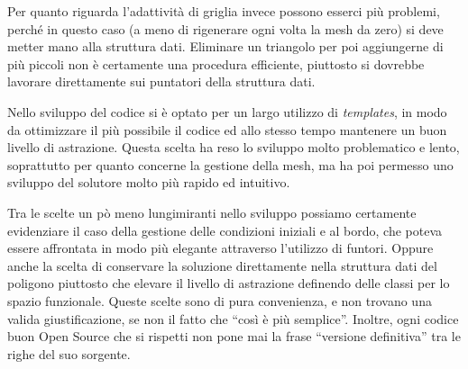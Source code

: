 Per quanto riguarda l'adattività di griglia invece possono esserci più problemi, perché in questo caso (a meno di rigenerare ogni volta la mesh da zero) si deve metter mano alla struttura dati. Eliminare un triangolo per poi aggiungerne di più piccoli non è certamente una procedura efficiente, piuttosto si dovrebbe lavorare direttamente sui puntatori della struttura dati.

Nello sviluppo del codice si è optato per un largo utilizzo di \emph{templates}, in modo da ottimizzare il più possibile il codice ed allo stesso tempo mantenere un buon livello di astrazione. Questa scelta ha reso lo sviluppo molto problematico e lento, soprattutto per quanto concerne la gestione della mesh, ma ha poi permesso uno sviluppo del solutore molto più rapido ed intuitivo.

Tra le scelte un pò meno lungimiranti nello sviluppo possiamo certamente evidenziare il caso della gestione delle condizioni iniziali e al bordo, che poteva essere affrontata in modo più elegante attraverso l'utilizzo di funtori. Oppure anche la scelta di conservare la soluzione direttamente nella struttura dati del poligono piuttosto che elevare il livello di astrazione definendo delle classi per lo spazio funzionale. Queste scelte sono di pura convenienza, e non trovano una valida giustificazione, se non il fatto che ``così è più semplice''. Inoltre, ogni codice buon Open Source che si rispetti non pone mai la frase ``versione definitiva'' tra le righe del suo sorgente.